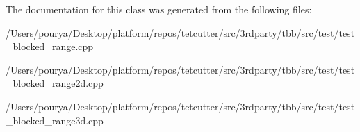 The documentation for this class was generated from the following files\+:\begin{DoxyCompactItemize}
\item 
/\+Users/pourya/\+Desktop/platform/repos/tetcutter/src/3rdparty/tbb/src/test/test\+\_\+blocked\+\_\+range.\+cpp\item 
/\+Users/pourya/\+Desktop/platform/repos/tetcutter/src/3rdparty/tbb/src/test/test\+\_\+blocked\+\_\+range2d.\+cpp\item 
/\+Users/pourya/\+Desktop/platform/repos/tetcutter/src/3rdparty/tbb/src/test/test\+\_\+blocked\+\_\+range3d.\+cpp\end{DoxyCompactItemize}

